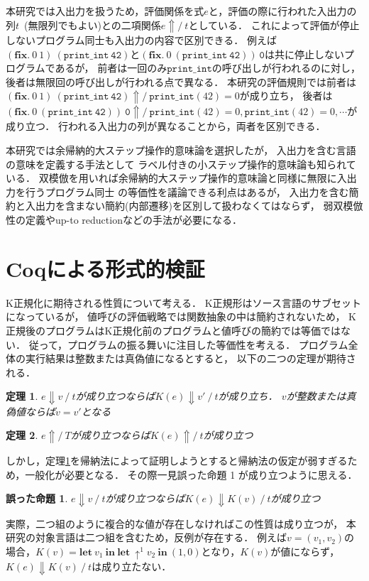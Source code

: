 \documentclass[T]{compsoft}
\newcommand{\keyword}[1]{\mathbf{#1}}
\newcommand{\LET}{\keyword{let}}
\newcommand{\FIX}{\keyword{fix}}
\newcommand{\IN}{\keyword{in}}
\newcommand{\theoremname}{定理}
\newtheorem{theorem}{\theoremname}
\newcommand{\wrongpropositioname}{誤った命題}
\newtheorem{wrongproposition}{\wrongpropositioname}
\begin{document}
本研究では入出力を扱うため，評価関係を式$e$と，評価の際に行われた入出力の列$t$~(無限列でもよい)との二項関係$e \Uparrow /~t$としている．
これによって評価が停止しないプログラム同士も入出力の内容で区別できる．
例えば$(\FIX.~0~1)~(\texttt{print\_int}~\texttt{42})$と$(\FIX.~0~(\texttt{print\_int}~\texttt{42}))~\texttt{0}$は共に停止しないプログラムであるが，
前者は一回のみ$\texttt{print\_int}$の呼び出しが行われるのに対し，後者は無限回の呼び出しが行われる点で異なる．
本研究の評価規則では前者は$(\FIX.~0~1)~(\texttt{print\_int}~\texttt{42})\Uparrow/~\texttt{print\_int}(42)=0$が成り立ち，
後者は$(\FIX.~0~(\texttt{print\_int}~\texttt{42}))~\texttt{0}\Uparrow /~\texttt{print\_int}(42)=0, \texttt{print\_int}(42)=0, \cdots$が成り立つ．
行われる入出力の列が異なることから，両者を区別できる．

本研究では余帰納的大ステップ操作的意味論を選択したが，
入出力を含む言語の意味を定義する手法として
ラベル付きの小ステップ操作的意味論も知られている．
双模倣を用いれば余帰納的大ステップ操作的意味論と同様に無限に入出力を行うプログラム同士
の等価性を議論できる利点はあるが，
入出力を含む簡約と入出力を含まない簡約(内部遷移)を区別して扱わなくてはならず，
弱双模倣性の定義やup-to reductionなどの手法が必要になる．

\section{Coqによる形式的検証}\label{section:verification}
K正規化に期待される性質について考える．
K正規形はソース言語のサブセットになっているが，
値呼びの評価戦略では関数抽象の中は簡約されないため，
K正規後のプログラムはK正規化前のプログラムと値呼びの簡約では等価ではない．
従って，プログラムの振る舞いに注目した等価性を考える．
プログラム全体の実行結果は整数または真偽値になるとすると，
以下の二つの定理が期待される．
\begin{theorem}\label{theorem:eval-correctness}
	$e\Downarrow v~/~t$が成り立つならば$K(e)\Downarrow v'~/~t$が成り立ち．
	$v$が整数または真偽値ならば$v=v'$となる
\end{theorem}
\begin{theorem}\label{theorem:diverge-correctness}
	$e\Uparrow/~T$が成り立つならば$K(e)\Uparrow/~t$が成り立つ
\end{theorem}

しかし，\theoremname\ref{theorem:eval-correctness}を帰納法によって証明しようとすると帰納法の仮定が弱すぎるため，一般化が必要となる．
その際一見\wrongpropositioname
1 %
が成り立つように思える．
\begin{wrongproposition}\label{wrongproposition:wrong-lemma}
	$e\Downarrow v~/~t$が成り立つならば$K(e)\Downarrow K(v)~/~t$が成り立つ
\end{wrongproposition}
実際，二つ組のように複合的な値が存在しなければこの性質は成り立つが，
本研究の対象言語は二つ組を含むため，反例が存在する．
例えば$v=(v_1,v_2)$の場合，$K(v)=\LET~v_1~\IN~\LET~\uparrow^1 v_2~\IN~(1,0)$となり，$K(v)$が値にならず，
$K(e)\Downarrow K(v)~/~t$は成り立たない．
\end{document}
